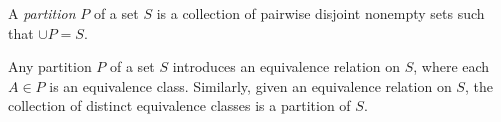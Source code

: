 \documentclass[12pt]{article}
\begin{document}
A \emph{partition} $P$ of a set $S$ is a collection of pairwise disjoint nonempty sets such that $\cup P = S$.

Any partition $P$ of a set $S$ introduces an equivalence relation on $S$, where each $A \in P$ is an equivalence class.  Similarly, given an equivalence relation on $S$, the collection of distinct equivalence classes is a partition of $S$.
\end{document}
